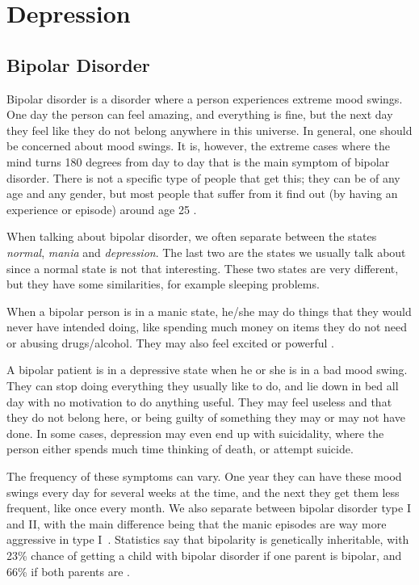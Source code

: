 \section{Depression}
\subsection{Bipolar Disorder}

Bipolar disorder is a disorder where a person experiences extreme mood swings. One day the person can feel amazing, and everything is fine, 
but the next day they feel like they do not belong anywhere in this universe. In general, one should be concerned about mood swings. 
It is, however, the extreme cases where the mind turns 180 degrees from day to day that is the main symptom of bipolar disorder. 
There is not a specific type of people that get this; they can be of any age and any gender, but most people that suffer from it find out 
(by having an experience or episode) around age 25 \cite{bipolar_statistics}. 

When talking about bipolar disorder, we often separate between the states \emph{normal}, \emph{mania} and \emph{depression}. 
The last two are the states we usually talk about since a normal state is not that interesting. These two states are very different, 
but they have some similarities, for example sleeping problems. 

When a bipolar person is in a manic state, he/she may do things that they would never have intended doing, like spending much money on items they do 
not need or abusing drugs/alcohol. They may also feel excited or powerful \cite{bipolar_overview}. 

A bipolar patient is in a depressive state when he or she is in a bad mood swing. They can stop doing everything they usually like to do, 
and lie down in bed all day with no motivation to do anything useful. They may feel useless and that they do not belong here, 
or being guilty of something they may or may not have done. In some cases, depression may even end up with suicidality, 
where the person either spends much time thinking of death, or attempt suicide.

The frequency of these symptoms can vary. One year they can have these mood swings every day for several weeks at the time, and the next they get them less frequent, 
like once every month. We also separate between bipolar disorder type I and II, with the main difference being that the manic episodes are way 
more aggressive in type I \cite{bipolar_types}. Statistics say that bipolarity is genetically inheritable, with 23\% chance of getting a child with bipolar 
disorder if one parent is bipolar, and 66\% if both parents are \cite{bipolar_statistics}. 

